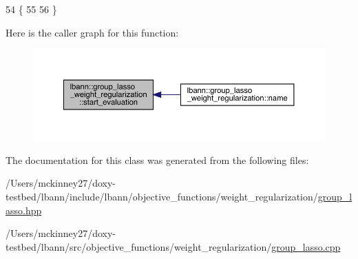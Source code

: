 \begin{DoxyCode}
54                                                          \{
55 
56 \}
\end{DoxyCode}
Here is the caller graph for this function\+:\nopagebreak
\begin{figure}[H]
\begin{center}
\leavevmode
\includegraphics[width=350pt]{classlbann_1_1group__lasso__weight__regularization_a5cc5fd80eed7f2b9d881c48edc6d49d0_icgraph}
\end{center}
\end{figure}


The documentation for this class was generated from the following files\+:\begin{DoxyCompactItemize}
\item 
/\+Users/mckinney27/doxy-\/testbed/lbann/include/lbann/objective\+\_\+functions/weight\+\_\+regularization/\hyperlink{group__lasso_8hpp}{group\+\_\+lasso.\+hpp}\item 
/\+Users/mckinney27/doxy-\/testbed/lbann/src/objective\+\_\+functions/weight\+\_\+regularization/\hyperlink{group__lasso_8cpp}{group\+\_\+lasso.\+cpp}\end{DoxyCompactItemize}
